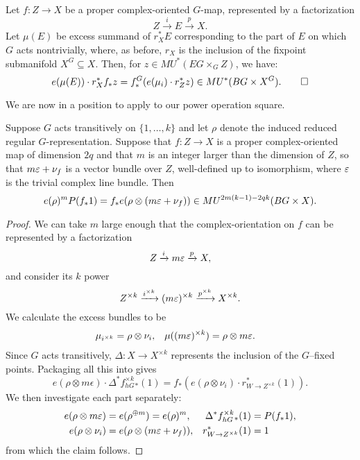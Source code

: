 \begin{lemma}\label{ProperCOIntersectionFormula}
Let $f: Z \to X$ be a proper complex-oriented $G$-map, represented by a factorization \[Z \xrightarrow i E \xrightarrow p X.\]  Let $\mu(E)$ be excess summand of $r_X^* E$ corresponding to the part of $E$ on which $G$ acts nontrivially, where, as before, $r_X$ is the inclusion of the fixpoint submanifold $X^G \subseteq X$.  Then, for $z \in MU^*(EG \times_G Z)$, we have: \[e(\mu(E)) \cdot r_X^* f_* z = f^G_*(e(\mu_i) \cdot r_Z^* z) \in MU^*(BG \times X^G). \qed\]
\end{lemma}

We are now in a position to apply  to our power operation square.

\begin{lemma}\label{PowerOpAndEulerClasses}
Suppose $G$ acts transitively on $\{1, \ldots, k\}$ and let $\rho$ denote the induced reduced regular $G$-representation. Suppose that $f: Z \to X$ is a proper complex-oriented map of dimension $2q$ and that $m$ is an integer larger than the dimension of $Z$, so that $m \varepsilon + \nu_f$ is a vector bundle over $Z$, well-defined up to isomorphism, where $\varepsilon$ is the trivial complex line bundle. Then \[e(\rho)^m P(f_* 1) = f_* e(\rho \otimes (m \varepsilon + \nu_f)) \in MU^{2m(k-1)-2qk}(BG \times X).\]
\end{lemma}
\begin{proof}
We can take $m$ large enough that the complex-orientation on $f$ can be represented by a factorization \[Z \xrightarrow i m \varepsilon \xrightarrow p X,\] and consider its $k${\th} power \[Z^{\times k} \xrightarrow{i^{\times k}} (m \varepsilon)^{\times k} \xrightarrow{p^{\times k}} X^{\times k}.\]  We calculate the excess bundles to be
\begin{align*}
\mu_{i^{\times k}} & = \rho \otimes \nu_i, &
\mu((m \varepsilon)^{\times k}) & = \rho \otimes m \varepsilon.
\end{align*}
Since $G$ acts transitively, $\Delta: X \to X^{\times k}$ represents the inclusion of the $G$--fixed points.  Packaging all this into  gives \[e(\rho \otimes m\epsilon) \cdot \Delta^* f^{\times k}_{hG}{}_*(1) = f_*(e(\rho \otimes \nu_i) \cdot r_{W \to Z^{\times k}}^*(1)).\]
We then investigate each part separately:
\begin{align*}
e(\rho \otimes m\varepsilon) & = e(\rho^{\oplus m}) = e(\rho)^m, &
\Delta^* f^{\times k}_{hG} {}_*(1) & = P(f_* 1), \\
e(\rho \otimes \nu_i) & = e(\rho \otimes (m \varepsilon + \nu_f)), &
r^*_{W \to Z^{\times k}}(1) & = 1
\end{align*}
from which the claim follows.
\end{proof}

